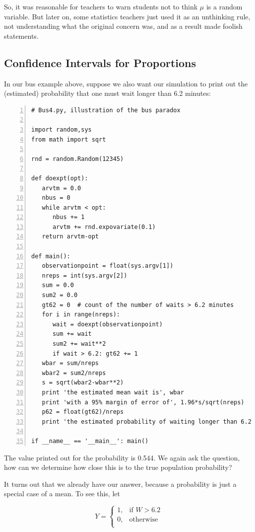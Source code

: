 So, it was reasonable for teachers to warn students not to think $\mu$
is a random variable.  But later on, some statistics teachers just used
it as an unthinking rule, not understanding what the original concern
was, and as a result made foolish statements.

\subsection{Confidence Intervals for Proportions}
\label{propcis}

In our bus example above, suppose we also want our simulation to print
out the (estimated) probability that one must wait longer than 6.2
minutes:

\begin{Verbatim}[fontsize=\relsize{-2},numbers=left]
# Bus4.py, illustration of the bus paradox

import random,sys
from math import sqrt

rnd = random.Random(12345)

def doexpt(opt):
   arvtm = 0.0
   nbus = 0
   while arvtm < opt:
      nbus += 1
      arvtm += rnd.expovariate(0.1)
   return arvtm-opt

def main():
   observationpoint = float(sys.argv[1])
   nreps = int(sys.argv[2])
   sum = 0.0
   sum2 = 0.0
   gt62 = 0  # count of the number of waits > 6.2 minutes
   for i in range(nreps):
      wait = doexpt(observationpoint)
      sum += wait
      sum2 += wait**2
      if wait > 6.2: gt62 += 1
   wbar = sum/nreps
   wbar2 = sum2/nreps
   s = sqrt(wbar2-wbar**2)
   print 'the estimated mean wait is', wbar
   print 'with a 95% margin of error of', 1.96*s/sqrt(nreps)
   p62 = float(gt62)/nreps
   print 'the estimated probability of waiting longer than 6.2 is', p62

if __name__ == '__main__': main()
\end{Verbatim}

The value printed out for the probability is 0.544.  We again ask the
question, how can we determine how close this is to the true population
probability?

It turns out that we already have our answer, because a probability is
just a special case of a mean.  To see this, let

\begin{equation}
Y =
\begin{cases}
   1, & \text{if $W > 6.2$} \\
   0, & \text{otherwise} \\
\end{cases}
\end{equation}

